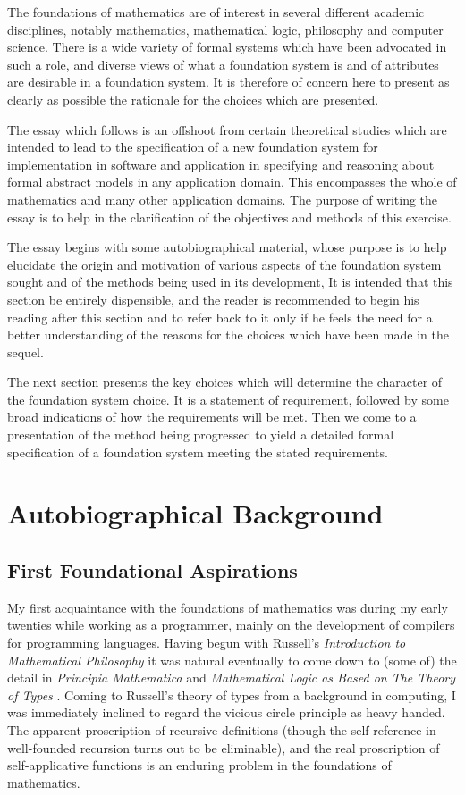 \documentclass[numreferences]{rbjk}
\begin{document}
\begin{article}
The foundations of mathematics are of interest in several different academic disciplines, notably mathematics, mathematical logic, philosophy and computer science.
There is a wide variety of formal systems which have been advocated in such a role, and diverse views of what a foundation system is and of attributes are desirable in a foundation system.
It is therefore of concern here to present as clearly as possible the rationale for the choices which are presented.

The essay which follows is an offshoot from certain theoretical studies which are intended to lead to the specification of a new foundation system for implementation in software and application in specifying and reasoning about formal abstract models in any application domain.
This encompasses the whole of mathematics and many other application domains.
The purpose of writing the essay is to help in the clarification of the objectives and methods of this exercise.

The essay begins with some autobiographical material, whose purpose is to help elucidate the origin and motivation of various aspects of the foundation system sought and of the methods being used in its development,
It is intended that this section be entirely dispensible, and the reader is recommended to begin his reading after this section and to refer back to it only if he feels the need for a better understanding of the reasons for the choices which have been made in the sequel.

The next section presents the key choices which will determine the character of the foundation system choice.
It is a statement of requirement, followed by some broad indications of how the requirements will be met.
Then we come to a presentation of the method being progressed to yield a detailed formal specification of a foundation system meeting the stated requirements.

\section{Autobiographical Background}

\subsection{First Foundational Aspirations}

My first acquaintance with the foundations of mathematics was during my early twenties while working as a programmer, mainly on the development of compilers for programming languages.
Having begun with Russell's \emph{Introduction to Mathematical Philosophy} \cite{russell10} it was natural eventually to come down to (some of) the detail in \emph{Principia Mathematica} \cite{russell10} and \emph{Mathematical Logic as Based on The Theory of Types} \cite{russell08}.
Coming to Russell's theory of types from a background in computing, I was immediately inclined to regard the vicious circle principle as heavy handed.
The apparent proscription of recursive definitions (though the self reference in well-founded recursion turns out to be eliminable), and the real proscription of self-applicative functions is an enduring problem in the foundations of mathematics.


\end{article}
\end{document}
